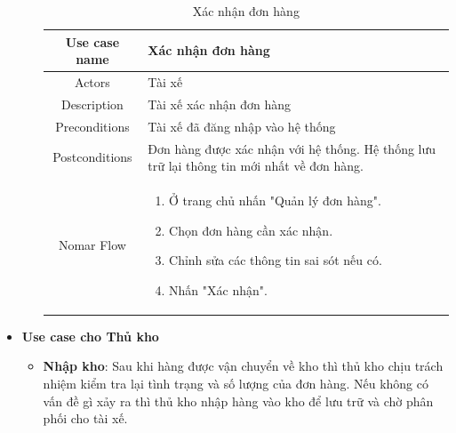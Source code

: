 \begin{itemize}
\begin{itemize}
		\begin{table}[!htp]
			\centering\begin{tabular}{|c|m{25em}|}
				\hline 
				Use case name & Xác nhận đơn hàng\\ 
				\hline 
				Actors & Tài xế \\ 
				\hline
				Description & Tài xế xác nhận đơn hàng \\
				\hline 
				Preconditions & Tài xế đã đăng nhập vào hệ thống \\
				\hline
				Postconditions & Đơn hàng được xác nhận với hệ thống. Hệ thống lưu trữ lại thông tin mới nhất về đơn hàng. \\
				\hline
				Nomar Flow & \begin{enumerate}
					\item Ở trang chủ nhấn "Quản lý đơn hàng".
					\item Chọn đơn hàng cần xác nhận.
					\item Chỉnh sửa các thông tin sai sót nếu có.
					\item Nhấn "Xác nhận".
				\end{enumerate}
				\\
				\hline
			\end{tabular}
			\caption{Xác nhận đơn hàng}
		\end{table}
		
	\end{itemize}
	
		
	
	\item \textbf{Use case cho Thủ kho}
	
	\begin{itemize}
		\item \textbf{Nhập kho}: Sau khi hàng được vận chuyển về kho thì thủ kho chịu trách nhiệm kiểm tra lại tình trạng và số lượng của đơn hàng. Nếu không có vấn đề gì xảy ra thì thủ kho nhập hàng vào kho để lưu trữ và chờ phân phối cho tài xế.
		

\end{itemize}
\end{itemize}
